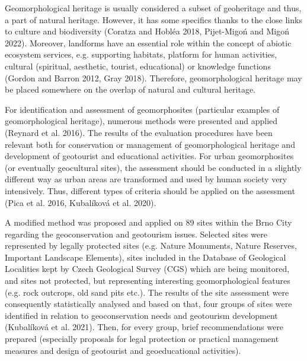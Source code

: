 {
Geomorphological heritage is usually considered a subset of geoheritage and thus, a part of natural heritage. However, it has some specifics thanks to the close links to culture and biodiversity (Coratza and Hobléa 2018, Pijet-Migoń and Migoń 2022). Moreover, landforms have an essential role within the concept of abiotic ecosystem services, e.g. supporting habitats, platform for human activities, cultural (spiritual, aesthetic, tourist, educational) or knowledge functions (Gordon and Barron 2012, Gray 2018). Therefore, geomorphological heritage may be placed somewhere on the overlap of natural and cultural heritage. 

For identification and assessment of geomorphosites (particular examples of geomorphological heritage), numerous methods were presented and applied (Reynard et al. 2016). The results of the evaluation procedures have been relevant both for conservation or management of geomorphological heritage and development of geotourist and educational activities. For urban geomorphosites (or eventually geocultural sites), the assessment should be conducted in a slightly different way as urban areas are transformed and used by human society very intensively. Thus, different types of criteria should be applied on the assessment (Pica et al. 2016, Kubalíková et al. 2020).

A modified method was proposed and applied on 89 sites within the Brno City regarding the geoconservation and geotourism issues. Selected sites were represented by legally protected sites (e.g. Nature Monuments, Nature Reserves, Important Landscape Elements), sites included in the Database of Geological Localities kept by Czech Geological Survey (CGS) which are being monitored, and sites not protected, but representing interesting geomorphological features (e.g. rock outcrops, old sand pits etc.). The results of the site assessment were consequently statistically analysed and based on that, four groups of sites were identified in relation to geoconservation needs and geotourism development (Kubalíková et al. 2021). Then, for every group, brief recommendations were prepared (especially proposals for legal protection or practical management measures and design of geotourist and geoeducational activities).

}
